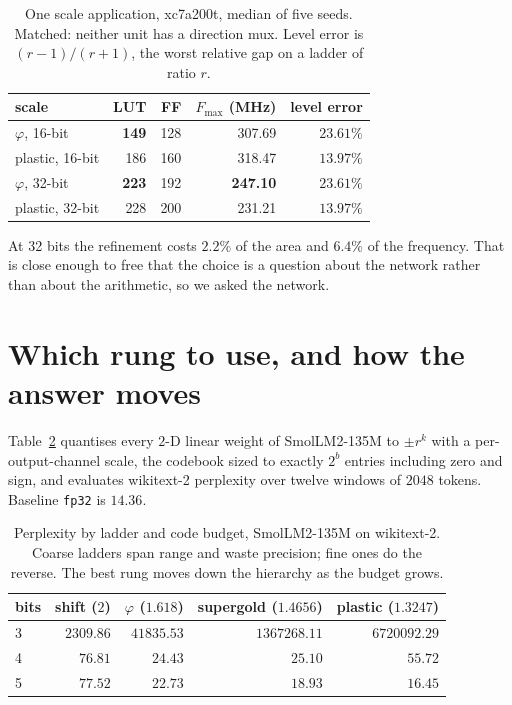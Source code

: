 \documentclass[11pt]{article}
\theoremstyle{definition}
\begin{document}
\begin{table}[t]\centering
\caption{One scale application, xc7a200t, median of five seeds. Matched: neither
unit has a direction mux. Level error is $(r-1)/(r+1)$, the worst relative gap
on a ladder of ratio $r$.}
\label{tab:hierarchy}
\begin{tabular}{lrrrr}
\toprule
scale & LUT & FF & $F_{\max}$ (MHz) & level error \\
\midrule
$\varphi$, 16-bit          & \textbf{149} & 128 & 307.69 & $23.61\%$ \\
plastic, 16-bit            & 186 & 160 & 318.47 & $\mathbf{13.97\%}$ \\
\addlinespace
$\varphi$, 32-bit          & \textbf{223} & 192 & \textbf{247.10} & $23.61\%$ \\
plastic, 32-bit            & 228 & 200 & 231.21 & $\mathbf{13.97\%}$ \\
\bottomrule
\end{tabular}
\end{table}

At 32 bits the refinement costs $2.2\%$ of the area and $6.4\%$ of the
frequency. That is close enough to free that the choice is a question about the
network rather than about the arithmetic, so we asked the network.

\section{Which rung to use, and how the answer moves}\label{sec:ladderlaw}

Table~\ref{tab:ladderlaw} quantises every $2$-D linear weight of SmolLM2-135M to
$\pm r^{k}$ with a per-output-channel scale, the codebook sized to exactly
$2^{b}$ entries including zero and sign, and evaluates wikitext-2 perplexity
over twelve windows of $2048$ tokens. Baseline \texttt{fp32} is $14.36$.

\begin{table}[t]\centering
\caption{Perplexity by ladder and code budget, SmolLM2-135M on wikitext-2.
Coarse ladders span range and waste precision; fine ones do the reverse. The
best rung moves down the hierarchy as the budget grows.}
\label{tab:ladderlaw}
\begin{tabular}{lrrrr}
\toprule
bits & shift ($2$) & $\varphi$ ($1.618$) & supergold ($1.4656$) & plastic ($1.3247$) \\
\midrule
3 & $\mathbf{2309.86}$ & $41835.53$ & $1367268.11$ & $6720092.29$ \\
4 & $76.81$ & $\mathbf{24.43}$ & $25.10$ & $55.72$ \\
5 & $77.52$ & $22.73$ & $18.93$ & $\mathbf{16.45}$ \\
\bottomrule
\end{tabular}
\end{table}
\end{document}
